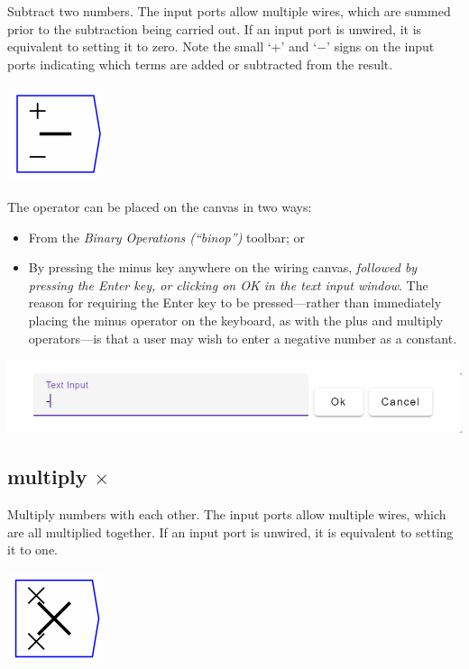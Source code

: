\label{Operation:subtract} Subtract two numbers. The input ports
allow multiple wires, which are summed prior to the subtraction being
carried out. If an input port is unwired, it is equivalent to setting
it to zero. Note the small `+' and `$-$' signs on the input ports
indicating which terms are added or subtracted from the result.

\includegraphics{images/MinusKey}

The operator can be placed on the canvas in two ways:
\begin{itemize}
\item From the \emph{Binary Operations (``binop'')} toolbar; or 
\item By pressing the minus key anywhere on the wiring canvas, \textit{followed
by pressing the Enter key, or clicking on OK in the text input window}.
The reason for requiring the Enter key to be pressed---rather than
immediately placing the minus operator on the keyboard, as with the
plus and multiply operators---is that a user may wish to enter a
negative number as a constant. 
\end{itemize}
\includegraphics{images/MinusTextWindow}

\subsection{multiply $\times$}

\label{Operation:multiply} Multiply numbers with each other. The
input ports allow multiple wires, which are all multiplied together.
If an input port is unwired, it is equivalent to setting it to one.

\includegraphics{images/MultiplyKey}

